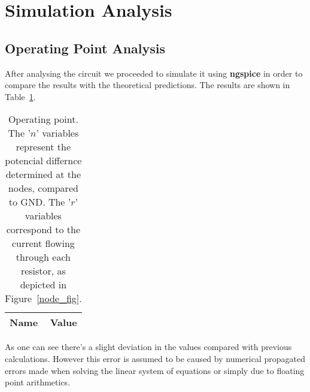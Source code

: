 \section{Simulation Analysis}
\label{sec:simulation}

\subsection{Operating Point Analysis}

After analysing the circuit we proceeded to simulate it using {\bf ngspice} in order to compare the results with the theoretical predictions. The results are shown in Table~\ref{tab:op}.


\begin{table}[h]
	\centering
	\begin{tabular}{|l|r|}
		\hline    
		{\bf Name} & {\bf Value} \\ \hline
		
	\end{tabular}
	\caption{Operating point. The '$n$' variables represent the potencial differnce determined at the nodes, compared to GND. The '$r$' variables correspond to the current flowing through each resistor, as depicted in Figure~\ref{node_fig}.}
	\label{tab:op}
\end{table}

As one can see there's a slight deviation in the values compared with previous calculations. However this error is assumed to be caused by numerical propagated errors made when solving the linear system of equations or simply due to floating point arithmetics. %
